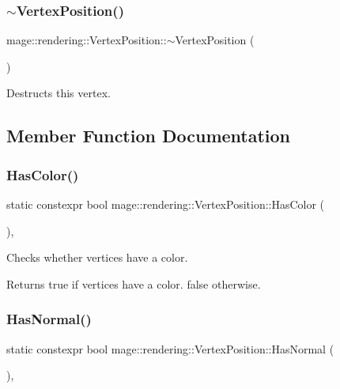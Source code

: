 \subsubsection{\texorpdfstring{$\sim$\+Vertex\+Position()}{~VertexPosition()}}
{\footnotesize\ttfamily mage\+::rendering\+::\+Vertex\+Position\+::$\sim$\+Vertex\+Position (\begin{DoxyParamCaption}{ }\end{DoxyParamCaption})\hspace{0.3cm}{\ttfamily [default]}}

Destructs this vertex. 

\subsection{Member Function Documentation}
\hypertarget{structmage_1_1rendering_1_1_vertex_position_afe87ed5fda84b4acc17a94a07d389ff7}{}\label{structmage_1_1rendering_1_1_vertex_position_afe87ed5fda84b4acc17a94a07d389ff7} 
\subsubsection{\texorpdfstring{Has\+Color()}{HasColor()}}
{\footnotesize\ttfamily static constexpr bool mage\+::rendering\+::\+Vertex\+Position\+::\+Has\+Color (\begin{DoxyParamCaption}{ }\end{DoxyParamCaption})\hspace{0.3cm}{\ttfamily [static]}, {\ttfamily [noexcept]}}

Checks whether vertices have a color.

\begin{DoxyReturn}{Returns}
{\ttfamily true} if vertices have a color. {\ttfamily false} otherwise. 
\end{DoxyReturn}
\hypertarget{structmage_1_1rendering_1_1_vertex_position_abf33917c1c93dfcffd25c146b53189e8}{}\label{structmage_1_1rendering_1_1_vertex_position_abf33917c1c93dfcffd25c146b53189e8} 
\subsubsection{\texorpdfstring{Has\+Normal()}{HasNormal()}}
{\footnotesize\ttfamily static constexpr bool mage\+::rendering\+::\+Vertex\+Position\+::\+Has\+Normal (\begin{DoxyParamCaption}{ }\end{DoxyParamCaption})\hspace{0.3cm}{\ttfamily [static]}, {\ttfamily [noexcept]}}

